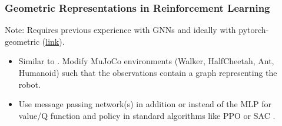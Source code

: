 \documentclass[a4paper]{article}
\begin{document}

\subsubsection{Geometric Representations in Reinforcement Learning}
Note: Requires previous experience with GNNs \cite{kipf2016semisupervised} and ideally with pytorch-geometric (\href{https://github.com/pyg-team/pytorch_geometric}{link}).
\begin{itemize}
  \item Similar to \citet{Wang2018nervenet}. Modify MuJoCo environments (Walker, HalfCheetah, Ant, Humanoid) such that the observations contain a graph representing the robot.
  \item Use message passing network(s) in addition or instead of the MLP for value/Q function and policy in standard algorithms like PPO \citet{Schulman2017} or SAC \citet{Haarnoja2018a}.
\end{itemize}

\end{document}
